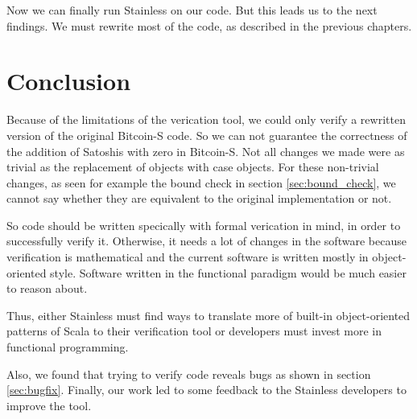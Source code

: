 \documentclass[runningheads]{llncs}
\begin{document}
Now we can finally run Stainless on our code.  But this leads us to
the next findings.  We must rewrite most of the code, as described in
the previous chapters.



\section{Conclusion}
\label{chap:conclusion}

Because of the limitations of the verication tool, we could only
verify a rewritten version of the original Bitcoin-S code.  So we can
not guarantee the correctness of the addition of Satoshis with zero in
Bitcoin-S.  Not all changes we made were as trivial as the replacement
of objects with case objects.  For these non-trivial changes, as seen
for example the bound check in section \ref{sec:bound_check}, we
cannot say whether they are equivalent to the original implementation
or not.

So code should be written specically with formal verication in mind,
in order to successfully verify it.  Otherwise, it needs a lot of
changes in the software because verification is mathematical and the
current software is written mostly in object-oriented style.  Software
written in the functional paradigm would be much easier to reason
about.

Thus, either Stainless must find ways to translate more of built-in
object-oriented patterns of Scala to their verification tool or
developers must invest more in functional programming.

Also, we found that trying to verify code reveals bugs as shown in
section \ref{sec:bugfix}.  Finally, our work led to some feedback to
the Stainless developers to improve the tool.






\end{document}
